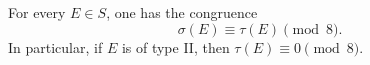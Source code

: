 For every $E \in S$, one has the congruence
$$
\sigma(E) \equiv \tau(E) \pmod{8}.
$$
In particular, if $E$ is of type II, then $\tau(E) \equiv 0 \pmod{8}$.

